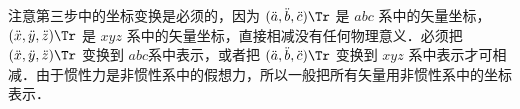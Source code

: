 注意第三步中的坐标变换是必须的，因为 $({\ddot a},{\ddot b},{\ddot c})\Tr$ 是 $abc$ 系中的矢量坐标， $({\ddot x},{\ddot y},{\ddot z})\Tr$ 是 $xyz$ 系中的矢量坐标，直接相减没有任何物理意义．必须把 $({\ddot x},{\ddot y},{\ddot z})\Tr$ 变换到 $abc$系中表示，或者把 $({\ddot a},{\ddot b},{\ddot c})\Tr$ 变换到 $xyz$ 系中表示才可相减．由于惯性力是非惯性系中的假想力，所以一般把所有矢量用非惯性系中的坐标表示．

